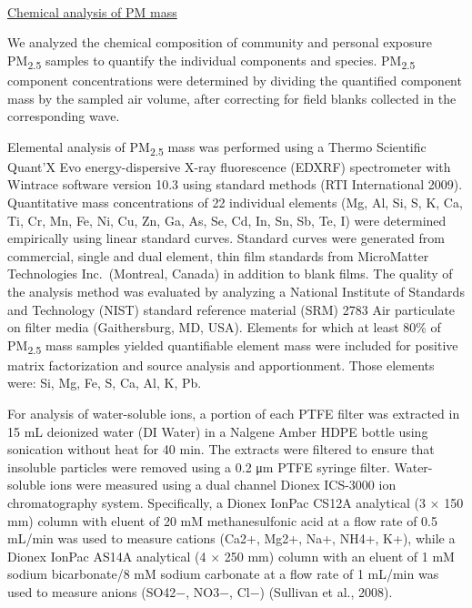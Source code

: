 \documentclass[
  letterpaper,
  DIV=11,
  numbers=noendperiod]{scrartcl}
\makeatletter
\let\oldparagraph\paragraph
\renewcommand{\paragraph}{ %
    \@ifstar %
      \xxxParagraphStar %
      \xxxParagraphNoStar %
  } %
\newcommand{\xxxParagraphStar}[1]{\oldparagraph*{#1}\mbox{}} %
\newcommand{\xxxParagraphNoStar}[1]{\oldparagraph{#1}\mbox{}} %
\providecommand{\DIFadd}[1]{{\protect\color{blue}\underline{#1}}} %
\providecommand{\DIFaddbegin}{} %
\providecommand{\DIFaddend}{} %
\providecommand{\DIFdelbegin}{} %
\providecommand{\DIFdelend}{} %
\newcommand{\DIFscaledelfig}{0.5}
\newlength{\DIFdelgraphicswidth} %
\newlength{\DIFdelgraphicsheight} %
\newcommand{\DIFaddincludegraphics}[2][]{{\color{blue}\fbox{\DIFOincludegraphics[#1]{#2}}}} %
\newcommand{\DIFdelincludegraphics}[2][]{%
\sbox{\DIFdelgraphicsbox}{\DIFOincludegraphics[#1]{#2}}%
\settoboxwidth{\DIFdelgraphicswidth}{\DIFdelgraphicsbox} %
\settoboxtotalheight{\DIFdelgraphicsheight}{\DIFdelgraphicsbox} %
\scalebox{\DIFscaledelfig}{%
\parbox[b]{\DIFdelgraphicswidth}{\usebox{\DIFdelgraphicsbox}\\[-\baselineskip] \rule{\DIFdelgraphicswidth}{0em}}\llap{\resizebox{\DIFdelgraphicswidth}{\DIFdelgraphicsheight}{%
\setlength{\unitlength}{\DIFdelgraphicswidth}%
\begin{picture}(1,1)%
\thicklines\linethickness{2pt} %
{\color[rgb]{1,0,0}\put(0,0){\framebox(1,1){}}}%
{\color[rgb]{1,0,0}\put(0,0){\line( 1,1){1}}}%
{\color[rgb]{1,0,0}\put(0,1){\line(1,-1){1}}}%
\end{picture}%
}\hspace*{3pt}}} %
} %
\DeclareRobustCommand{\DIFaddbegin}{\DIFOaddbegin \let\includegraphics\DIFaddincludegraphics} %
\DeclareRobustCommand{\DIFaddend}{\DIFOaddend \let\includegraphics\DIFOincludegraphics} %
\DeclareRobustCommand{\DIFdelbegin}{\DIFOdelbegin \let\includegraphics\DIFdelincludegraphics} %
\DeclareRobustCommand{\DIFdelend}{\DIFOaddend \let\includegraphics\DIFOincludegraphics} %
\makeatother
\begin{document}
\DIFdelbegin %
\DIFdelend \DIFaddbegin \paragraph{\DIFadd{Chemical analysis of PM
mass}}\label{chemical-analysis-of-pm-mass}
\DIFaddend 

We analyzed the chemical composition of community and personal exposure
PM\textsubscript{2.5} samples to quantify the individual components and
species. PM\textsubscript{2.5} component concentrations were determined
by dividing the quantified component mass by the sampled air volume,
after correcting for field blanks collected in the corresponding wave.

Elemental analysis of PM\textsubscript{2.5} mass was performed using a
Thermo Scientific Quant'X Evo energy-dispersive X-ray fluorescence
(EDXRF) spectrometer with Wintrace software version 10.3 using standard
methods (RTI International 2009). Quantitative mass concentrations of 22
individual elements (Mg, Al, Si, S, K, Ca, Ti, Cr, Mn, Fe, Ni, Cu, Zn,
Ga, As, Se, Cd, In, Sn, Sb, Te, I) were determined empirically using
linear standard curves. Standard curves were generated from commercial,
single and dual element, thin film standards from MicroMatter
Technologies Inc.~(Montreal, Canada) in addition to blank films. The
quality of the analysis method was evaluated by analyzing a National
Institute of Standards and Technology (NIST) standard reference material
(SRM) 2783 Air particulate on filter media (Gaithersburg, MD, USA).
Elements for which at least 80\% of PM\textsubscript{2.5} mass samples
yielded quantifiable element mass were included for positive matrix
factorization and source analysis and apportionment. Those elements
were: Si, Mg, Fe, S, Ca, Al, K, Pb.

For analysis of water-soluble ions, a portion of each PTFE filter was
extracted in 15 mL deionized water (DI Water) in a Nalgene Amber HDPE
bottle using sonication without heat for 40 min. The extracts were
filtered to ensure that insoluble particles were removed using a 0.2 μm
PTFE syringe filter. Water-soluble ions were measured using a dual
channel Dionex ICS-3000 ion chromatography system. Specifically, a
Dionex IonPac CS12A analytical (3 × 150 mm) column with eluent of 20 mM
methanesulfonic acid at a flow rate of 0.5 mL/min was used to measure
cations (Ca2+, Mg2+, Na+, NH4+, K+), while a Dionex IonPac AS14A
analytical (4 × 250 mm) column with an eluent of 1 mM sodium
bicarbonate/8 mM sodium carbonate at a flow rate of 1 mL/min was used to
measure anions (SO42−, NO3−, Cl−) (Sullivan et al., 2008).
\end{document}
